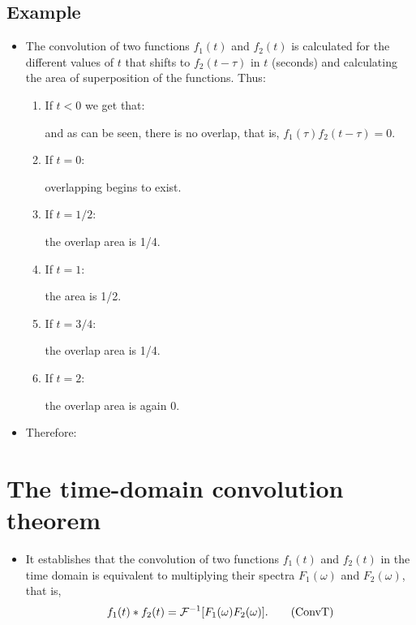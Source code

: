 \subsection*{Example}
\begin{itemize}
\item The convolution of two functions $f_1(t)$ and $f_2(t)$ is
  calculated for the different values of $t$ that shifts to
  $f_2(t-\tau)$ in $t$ (seconds) and calculating the area of
  superposition of the functions. Thus:
  \begin{enumerate}
    \item If $t<0$ we get that:
      \begin{center}
      \end{center}
      and as can be seen, there is no overlap, that is,
      $f_1(\tau)f_2(t-\tau)=0$.
    \item If $t=0$:
      \begin{center}
      \end{center}
      overlapping begins to exist.
    \item If $t=1/2$:
      \begin{center}
      \end{center}
      the overlap area is 1/4.
    \item If $t=1$:
      \begin{center}
      \end{center}
      the area is 1/2.
    \item If $t=3/4$:
      \begin{center}
      \end{center}
      the overlap area is 1/4.
    \item If $t=2$:
      \begin{center}
      \end{center}
      the overlap area is again 0.
  \end{enumerate}
\item Therefore:
  \begin{center}
  \end{center}
\end{itemize}

\section{The time-domain convolution theorem}
\begin{itemize}
\item It establishes that the convolution of two functions $f_1(t)$ and
  $f_2(t)$ in the time domain is equivalent to multiplying their spectra
  $F_1(\omega)$ and $F_2(\omega)$, that is,
\begin{equation}
  f_1(t)*f_2(t) = {\cal F}^{-1}[F_1(\omega)F_2(\omega)].
  \tag{ConvT}
  \label{eq:teorema_convolucion_tiempo}
\end{equation}
\end{itemize}

